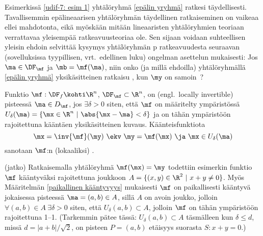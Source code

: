 Esimerkissä \ref{udif-7: esim 1} yhtälöryhmä \eqref{epälin yryhmä} ratkesi täydellisesti.
Tavallisemmin epälineaarisen yhtälöryhmän täydellinen ratkaiseminen on vaikeaa ellei
mahdotonta, eikä myöskään mitään lineaaristen yhtälöryhmien teoriaan
verrattavaa yleisempää ratkeavuusteoriaa ole. Sen sijaan voidaan suhteellisen yleisin ehdoin
selvittää kysymys yhtälöryhmän p ratkeavuudesta seuraavan (sovelluksissa
tyypillisen, vrt.\ edellinen luku) ongelman asettelun mukaisesti: Jos $\ma \in \DF_\mf$ ja
$\mb=\mf(\ma)$, niin onko (ja millä ehdoilla) yhtälöryhmällä \eqref{epälin yryhmä}
yksikäsitteinen ratkaisu  , kun $\my$ on samoin 
\,?
\begin{Def} \label{paikallinen kääntyvyys} 
Funktio $\mf:\DF_f\kohti\R^n$, $\DF_\mf\subset\R^n$, on  
(engl.\ locally invertible) pisteessä $\ma\in D_\mf$, jos $\exists\delta>0$ siten, että $\mf$
on määritelty ympäristössä $U_\delta(\ma)=\{\mx\in\R^n \ | \ \abs{\mx-\ma}<\delta\}$ ja on
tähän ympäristöön rajoitettuna kääntäen yksikäsitteinen kuvaus. Käänteisfunktiota
\[
\mx=\inv{\mf}(\my) \ \ekv \ \my=\mf(\mx) \ \ja \ \mx\in U_\delta(\ma)
\]
sanotaan $\mf$:n  (lokaaliksi) .
\end{Def}
\jatko \begin{Exa} (jatko) Ratkaisemalla yhtälöryhmä $\mf(\mx)=\my$ todettiin esimerkin
funktio $\mf$ kääntyväksi rajoitettuna joukkoon $A=\{(x,y)\in\R^2\ | \ x+y \neq 0\}$.
Myös Määritelmän \ref{paikallinen kääntyvyys} mukaisesti $\mf$ on paikallisesti kääntyvä
jokaisessa pisteessä $\ma = (a,b) \in A$, sillä $A$ on avoin joukko, jolloin
$\forall (a,b) \in A\ \exists \delta>0$ siten, että $U_\delta(a,b) \subset A$, jolloin $\mf$ on
tähän ympäristöön rajoitettuna 1--1. (Tarkemmin pätee tässä: $U_\delta(a,b) \subset A$
täsmälleen kun $\delta \le d$, missä $d=|a+b|/\sqrt{2}$, on pisteen $P=(a,b)$ etäisyys suorasta
$S: x+y=0$.) \loppu
\end{Exa}

